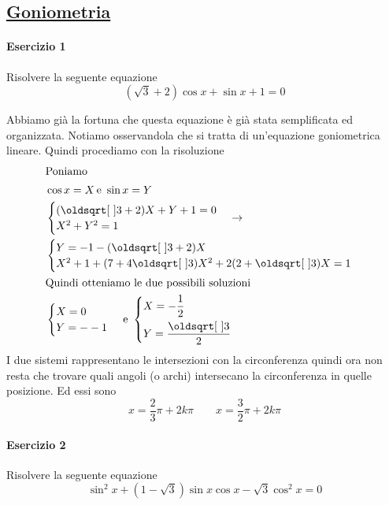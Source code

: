 \subsection*{\hyperref[sec:goniometria]{Goniometria}}\label{ex:goniometria}
\paragraph{Esercizio 1}
Risolvere la seguente equazione
\begin{equation*}
(\sqrt{3}+2)\cos x + \sin x + 1 =0
\end{equation*}
\divisor

Abbiamo già la fortuna che questa equazione è già stata semplificata ed organizzata. Notiamo 
osservandola che si tratta di un'equazione goniometrica lineare. Quindi procediamo con la risoluzione
\begin{align*}
\intertext{Poniamo}
&\cos x = X\,\text{e } \sin x = Y\\
&\begin{cases}
(\sqrt{3}+2)X + Y + 1 = 0\\
X^2+Y^2 = 1
\end{cases} \rightarrow\\
&\begin{cases}
Y = -1-(\sqrt{3}+2)X\\
X^2+1+(7+4\sqrt{3})X^2+2(2+\sqrt{3})X = 1
\end{cases}\\
\intertext{Quindi otteniamo le due possibili soluzioni}
&\begin{cases}
X = 0\\ Y=--1
\end{cases}\,\text{e }
\begin{dcases}
X = -\frac{1}{2}\\ Y = \frac{\sqrt{3}}{2}
\end{dcases}
\end{align*}
I due sistemi rappresentano le intersezioni con la circonferenza quindi ora non resta che trovare 
quali angoli (o archi) intersecano la circonferenza in quelle posizione. Ed essi sono
\begin{equation*}
x = \frac{2}{3}\pi + 2k\pi \qquad x = \frac{3}{2}\pi + 2k\pi
\end{equation*}

\paragraph{Esercizio 2}
Risolvere la seguente equazione
\begin{equation*}
\sin^2x + (1-\sqrt{3})\sin x\cos x-\sqrt{3}\cos^2 x = 0
\end{equation*}
\divisor

